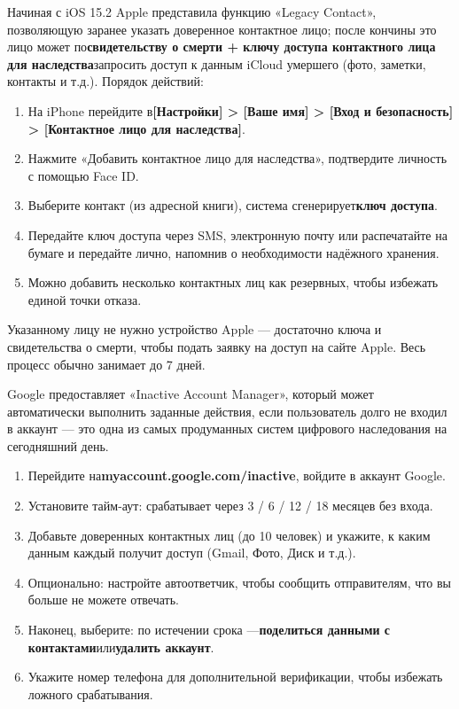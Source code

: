 Начиная с iOS 15.2 Apple представила функцию «Legacy Contact», позволяющую заранее указать доверенное контактное лицо; после кончины это лицо может по\textbf{свидетельству о смерти + ключу доступа контактного лица для наследства}запросить доступ к данным iCloud умершего (фото, заметки, контакты и т.д.). Порядок действий:

\begin{enumerate}
  \item На iPhone перейдите в\textbf{[Настройки] > [Ваше имя] > [Вход и безопасность] > [Контактное лицо для наследства]}.
  \item Нажмите «Добавить контактное лицо для наследства», подтвердите личность с помощью Face ID.
  \item Выберите контакт (из адресной книги), система сгенерирует\textbf{ключ доступа}.
  \item Передайте ключ доступа через SMS, электронную почту или распечатайте на бумаге и передайте лично, напомнив о необходимости надёжного хранения.
  \item Можно добавить несколько контактных лиц как резервных, чтобы избежать единой точки отказа.
\end{enumerate}

Указанному лицу не нужно устройство Apple — достаточно ключа и свидетельства о смерти, чтобы подать заявку на доступ на сайте Apple. Весь процесс обычно занимает до 7 дней.


Google предоставляет «Inactive Account Manager», который может автоматически выполнить заданные действия, если пользователь долго не входил в аккаунт — это одна из самых продуманных систем цифрового наследования на сегодняшний день.

\begin{enumerate}
  \item Перейдите на\textbf{myaccount.google.com/inactive}, войдите в аккаунт Google.
  \item Установите тайм-аут: срабатывает через 3 / 6 / 12 / 18 месяцев без входа.
  \item Добавьте доверенных контактных лиц (до 10 человек) и укажите, к каким данным каждый получит доступ (Gmail, Фото, Диск и т.д.).
  \item Опционально: настройте автоответчик, чтобы сообщить отправителям, что вы больше не можете отвечать.
  \item Наконец, выберите: по истечении срока —\textbf{поделиться данными с контактами}или\textbf{удалить аккаунт}.
  \item Укажите номер телефона для дополнительной верификации, чтобы избежать ложного срабатывания.
\end{enumerate}

